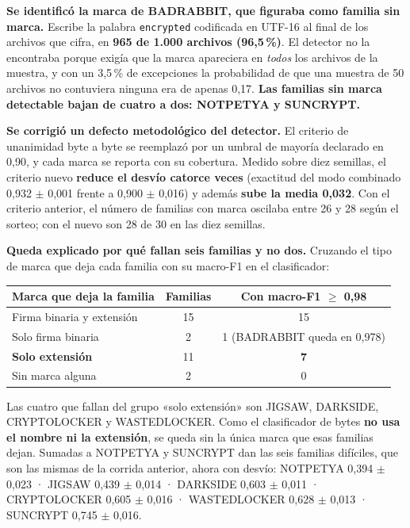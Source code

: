 \documentclass[11pt,a4paper]{article}
\begin{document}
\textbf{Se identificó la marca de BADRABBIT, que figuraba como familia sin marca.} Escribe la
palabra \texttt{encrypted} codificada en UTF-16 al final de los archivos que cifra, en
\textbf{965 de 1.000 archivos (96,5\,\%)}. El detector no la encontraba porque exigía que la
marca apareciera en \emph{todos} los archivos de la muestra, y con un 3,5\,\% de excepciones la
probabilidad de que una muestra de 50 archivos no contuviera ninguna era de apenas 0,17.
\textbf{Las familias sin marca detectable bajan de cuatro a dos: NOTPETYA y SUNCRYPT.}

\textbf{Se corrigió un defecto metodológico del detector.} El criterio de unanimidad byte a
byte se reemplazó por un umbral de mayoría declarado en 0,90, y cada marca se reporta con su
cobertura. Medido sobre diez semillas, el criterio nuevo \textbf{reduce el desvío catorce
veces} (exactitud del modo combinado 0,932 $\pm$ 0,001 frente a 0,900 $\pm$ 0,016) y además
\textbf{sube la media 0,032}. Con el criterio anterior, el número de familias con marca
oscilaba entre 26 y 28 según el sorteo; con el nuevo son 28 de 30 en las diez semillas.

\textbf{Queda explicado por qué fallan seis familias y no dos.} Cruzando el tipo de marca que
deja cada familia con su macro-F1 en el clasificador:

\begin{center}
\small
\begin{tabular}{lcc}
\toprule
\textbf{Marca que deja la familia} & \textbf{Familias} & \textbf{Con macro-F1 $\geq$ 0,98} \\
\midrule
Firma binaria y extensión & 15 & 15 \\
Solo firma binaria & 2 & 1 \; (BADRABBIT queda en 0,978) \\
\textbf{Solo extensión} & 11 & \textbf{7} \\
Sin marca alguna & 2 & 0 \\
\bottomrule
\end{tabular}
\end{center}

Las cuatro que fallan del grupo «solo extensión» son JIGSAW, DARKSIDE, CRYPTOLOCKER y
WASTEDLOCKER. Como el clasificador de bytes \textbf{no usa el nombre ni la extensión}, se queda
sin la única marca que esas familias dejan. Sumadas a NOTPETYA y SUNCRYPT dan las seis familias
difíciles, que son las mismas de la corrida anterior, ahora con desvío: NOTPETYA
0,394 $\pm$ 0,023 · JIGSAW 0,439 $\pm$ 0,014 · DARKSIDE 0,603 $\pm$ 0,011 · CRYPTOLOCKER
0,605 $\pm$ 0,016 · WASTEDLOCKER 0,628 $\pm$ 0,013 · SUNCRYPT 0,745 $\pm$ 0,016.
\end{document}
